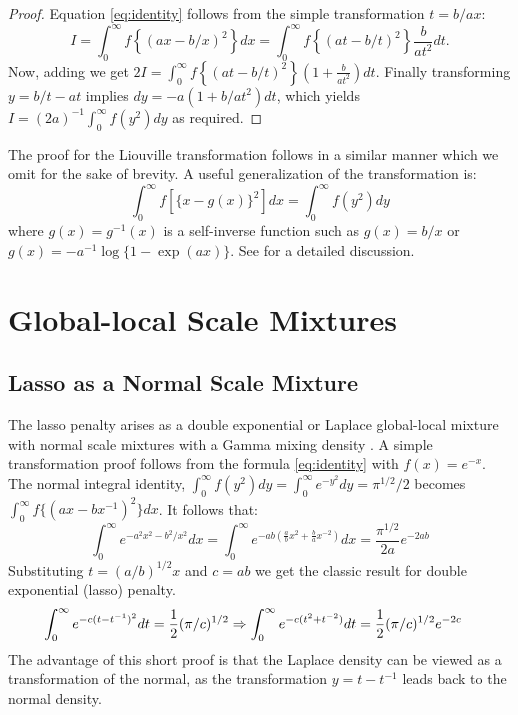 \documentclass[letterpaper,11pt]{article}
\begin{document}
\begin{proof}
Equation \eqref{eq:identity} follows from the simple transformation $t = b/ax$: 
\begin{equation*}
  I = \int_{0}^{\infty} f \left\{(ax - b/x)^2 \right\} dx = \int_{0}^{\infty} f \left\{(at - b/t)^2 \right\} \frac{b}{at^2} dt.
\end{equation*}
Now, adding we get $2 I = \int_{0}^{\infty} f \left\{(at - b/t)^2 \right\} \left( 1+\frac{b}{at^2} \right) dt$. Finally transforming $y = b/t - at$ implies $dy = -a (1+b/at^2) dt$, which yields $I = (2a)^{-1} \int_{0}^{\infty} f(y^2) dy$ as required. 
\end{proof}
The proof for the Liouville transformation follows in a similar manner which we omit for the sake of brevity. A useful generalization of the \CS transformation is: 
\begin{equation}
  \int_0^\infty f \left[ \{x-g(x)\}^2 \right] dx = \int_0^\infty f( y^2 ) dy \label{eq:gen}
\end{equation}
where $g(x)=g^{-1}(x)$ is a self-inverse function such as $g(x) = b/x$ or $g(x) = -a^{-1}\log\{1-\exp(a x)\}$. See \citet{amdeberhan2010cauchy} for a detailed discussion. %

\section{Global-local Scale Mixtures}
\subsection{Lasso as a Normal Scale Mixture}
The lasso penalty arises as a double exponential or Laplace global-local mixture with normal scale mixtures with a Gamma mixing density \citep{andrews1974scale}. A simple transformation proof follows from the \CS formula \eqref{eq:identity} with $ f(x) = e^{-x} $. The normal integral identity, $ \int_{0}^{\infty} f(y^2) dy = \int_0^\infty e^{-y^2} d y = {\pi}^{1/2}/2 $ becomes $\int_{0}^{\infty} f\{(ax-bx^{-1})^2\} dx$. It follows that: 
$$
\int_0^\infty e^{- a^2 x^2 - b^2 / x^2 } d x = \int_0^{\infty} e^{-ab \left( \frac{a}{b} x^2 + \frac{b}{a}x^{-2} \right)} dx =  \frac{{\pi}^{1/2}}{2a} e^{- 2 ab}
$$
Substituting $ t = (a/b)^{1/2} x $ and $c = ab$ we get the classic \citet{andrews1974scale} result for double exponential (lasso) penalty.  
\begin{align*}
  \int_0^\infty e^{- c (t - t^{-1})^2} d t & = \half (\pi/c)^{1/2} \Rightarrow \int_0^\infty e^{- c (t^2 + t^{-2})} d t = \half (\pi/c)^{1/2} e^{-2c} %
\end{align*}
The advantage of this short proof is that the Laplace density can be viewed as a transformation of the normal, as the transformation $y = t - t^{-1}$ leads back to the normal density.
\end{document}
